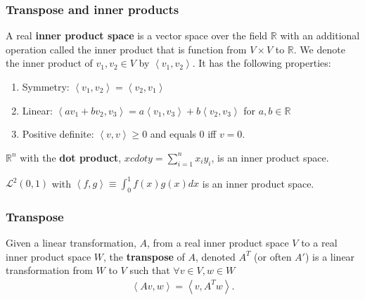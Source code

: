 \documentclass[compress]{beamer}
\def\R{\mathbb{R}}
\newcommand{\iprod}[2]{\left\langle {#1} , {#2} \right\rangle}
\theoremstyle{definition}
\begin{document}
\subsubsection{Transpose and inner products}
\begin{frame}
  \begin{definition}
    A real \textbf{inner product space} is a vector space over the field
    $\R$ with an additional operation called the inner product that is
    function from $V \times V$ to $\mathbb{R}$. We denote the inner
    product of $v_1, v_2 \in V$ by $\iprod{v_1}{v_2}$. It has the
    following properties:
    \begin{enumerate}
    \item Symmetry: $\iprod{v_1}{v_2} = \iprod{v_2}{v_1}$
    \item Linear: $\iprod{a v_1 + b v_2}{v_3} = a \iprod{v_1}{v_3} + b
      \iprod{v_2}{v_3}$ for $a, b \in \R$
    \item Positive definite: $\iprod{v}{v} \geq 0$ and equals $0$ iff
      $v=0$. 
    \end{enumerate}  
  \end{definition}
\end{frame}

\begin{frame}
  \begin{example}
    $\R^n$ with the \textbf{dot product}, $x cdot y = \sum_{i=1}^n x_i
    y_i$, is an inner product space. 
  \end{example}
  
  \begin{example}
    $\mathcal{L}^2(0,1)$ with $\iprod{f}{g} \equiv \int_0^1 f(x) g(x)
    dx$ is an inner product space.
  \end{example}
\end{frame}

\begin{frame}
  \frametitle{Transpose}
  \begin{definition}
    Given a linear transformation, $A$, from a real inner product space
    $V$ to a real inner product space $W$, the
    \textbf{transpose} of $A$, denoted $A^T$ (or often $A'$) is a
    linear transformation from $W$ to $V$ such that $\forall v \in V, w
    \in W$
    \begin{align*}
      \iprod{A v}{w} = \iprod{v}{A^T w}.
    \end{align*}
  \end{definition}
\end{frame}
\end{document}
